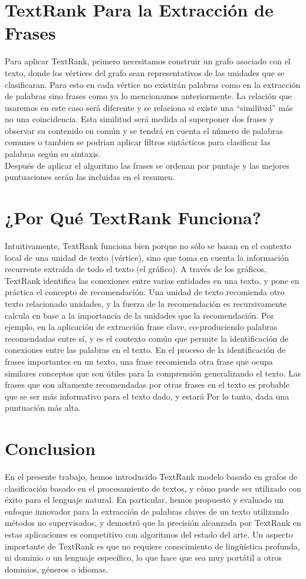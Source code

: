 \documentclass[conference]{IEEEtran}
\begin{document}
\section{TextRank Para la Extracción de Frases}
Para aplicar TextRank, primero necesitamos construir un grafo asociado con el texto, donde los vértices del grafo sean representativos de las unidades que se clasificaran. Para esto en cada vértice no existirán palabras como en la extracción de palabras sino frases como ya lo mencionamos anteriormente. La relación que usaremos en este caso será diferente y se relaciona si existe una “similitud” más no una coincidencia. Esta similitud será medida al superponer dos frases y observar su contenido en común y se tendrá en cuenta el número de palabras comunes o tambien se podrian aplicar filtros sintácticos para clasificar las palabras según su sintaxis. \\
Después de aplicar el algoritmo las frases se ordenan por puntaje y las mejores puntuaciones serán las incluidas en el resumen.

\section{¿Por Qué TextRank Funciona? }
Intuitivamente, TextRank funciona bien porque no sólo se basan en el contexto local de una unidad de texto (vértice), sino que toma en cuenta la información recurrente extraída de todo el texto (el gráfico). A través de los gráficos, TextRank identifica las conexiones entre varias entidades en una texto, y pone en práctica el concepto de recomendación. Una unidad de texto recomienda otro texto relacionado unidades, y la fuerza de la recomendación es recursivamente calcula en base a la importancia de la unidades que la recomendación. Por ejemplo, en la aplicación de extracción frase clave, co-produciendo palabras recomendadas entre sí, y es el contexto común que permite la identificación de conexiones entre las palabras en el texto. En el proceso de la identificación de frases importantes en un texto, una frase recomienda otra frase que ocupa similares conceptos que son útiles para la comprensión generalizando el texto. Las frases que son altamente recomendadas por otras frases en el texto es probable que se ser más informativo para el texto dado, y estará Por lo tanto, dada una puntuación más alta.

\section{Conclusion}
En el presente trabajo, hemos introducido TextRank modelo basado en grafos de clasificación basado en el procesamiento de textos, y cómo puede ser utilizado con éxito para el lenguaje natural. En particular, hemos propuesto y evaluado un enfoque innovador para la extracción de palabras claves de un texto utilizando métodos no supervisados, y demostró que la precisión alcanzada por TextRank en estas aplicaciones es competitivo con algoritmos del estado del arte. Un aspecto importante de TextRank es que no requiere conocimiento de lingüística profunda, ni dominio o un lenguaje específico, lo que hace que sea muy portátil a otros dominios, géneros o idiomas.
\end{document}
